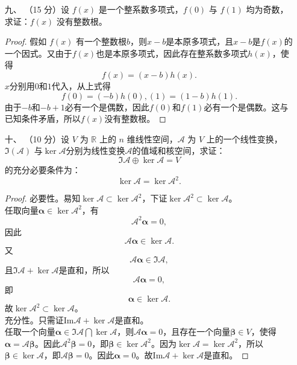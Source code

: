 \begin{enumerate}[1~]
\begin{proof}
\begin{equation}
\left( \begin{array}{c}
	x_1^*\\
	x_2^*\\
	x_3^*\\
\end{array} \right) =T\left( \begin{array}{c}
	x_1\\
	x_2\\
	x_3\\
\end{array} \right) .
\end{equation}
则\[
f(x_1, x_2, x_3)=4{x_2^*}^2+9{x_3^*}^2.
\]
下面判断曲面类型。作直角坐标变换  \eqref{transformation}，则原二次曲面 $5 x _ { 1 } ^ { 2 } + 5 x _ { 2 } ^ { 2 } + 3 x _ { 3 } ^ { 2 } - 2 x _ { 1 } x _ { 2 } + 6 x _ { 1 } x _ { 3 } - 6 x _ { 2 } x _ { 3 }=1$在新的直角坐标系中的方程为：\[
4{x_2^*}^2+9{x_3^*}^2=1.
\]
由此看出，这是椭圆柱面。
\end{proof}

\item[九、]
（15 分）设 $f(x)$ 是一个整系数多项式，$f(0)$ 与 $f(1)$ 均为奇数，求证：$f(x)$ 没有整数根。
\begin{proof}
假如 $f(x)$ 有一个整数根$b$，则$x-b$是本原多项式，且$x-b$是$f(x)$的一个因式。又由于$f(x)$也是本原多项式，因此存在整系数多项式$h(x)$，使得\[
f(x)=(x-b)h(x).
\]
$x$分别用$0$和$1$代入，从上式得\[
f(0)=(-b)h(0), (1)=(1-b)h(1).\]
由于$-b$和$-b+1$必有一个是偶数，因此$f(0)$和$f(1)$必有一个是偶数。这与已知条件矛盾，所以$f(x)$没有整数根。
\end{proof}

\item[十、]
（10 分）设 $V$ 为 $\mathbb{R}$ 上的 $n$ 维线性空间，$\mathscr{A}$ 为 $V$ 上的一个线性变换，$\Im(\mathscr{A})$ 与$\ker\mathscr{A}$分别为线性变换$\mathscr{A}$的值域和核空间，求证：\[
\Im\mathscr{A}\oplus\ker\mathscr{A}= V
\]
的充分必要条件为：\[
\ker\mathscr{A} = \ker\mathscr{A}^2.
\]
\begin{proof}
必要性。易知$\ker\mathscr{A}\subset\ker\mathscr{A}^2$，下证$\ker\mathscr{A}^2\subset\ker\mathscr{A}$。\\
任取向量$\boldsymbol{\alpha} \in \ker\mathscr{A}^2$，有
$$\mathscr{A}^2\boldsymbol{\alpha}=0,$$
因此\[
\mathscr{A}\boldsymbol{\alpha}\in\ker\mathscr{A}.
\]
又\[
\mathscr{A}\boldsymbol{\alpha}\in\Im\mathscr{A},
\]
且$\Im\mathscr{A}+\ker\mathscr{A}$是直和，所以
$$\mathscr{A}\boldsymbol{\alpha}=0,$$
即\[
\boldsymbol{\alpha}\in\ker\mathscr{A}.
\]
故$\ker\mathscr{A}^2\subset\ker\mathscr{A}$。\\
充分性。只需证$\text{Im}\mathscr{A}+\ker\mathscr{A}$是直和。\\
任取一个向量$\boldsymbol{\alpha}\in \Im\mathscr{A}\bigcap\ker\mathscr{A}$，则$\mathscr{A}\boldsymbol{\alpha}=0$，且存在一个向量$\boldsymbol{\beta}\in V$，使得$\boldsymbol{\alpha}=\mathscr{A}\boldsymbol{\beta}$。因此$\mathscr{A}^2\boldsymbol{\beta}=0$，即$\boldsymbol{\beta}\in\ker\mathscr{A}^2$。因为$\ker\mathscr{A}=\ker\mathscr{A}^2$，所以$\boldsymbol{\beta}\in\ker\mathscr{A}$，即$\mathscr{A}\boldsymbol{\beta}=0$。因此$\boldsymbol{\alpha}=0$。故$\text{Im}\mathscr{A}+\ker\mathscr{A}$是直和。


\end{proof}
\end{enumerate}
